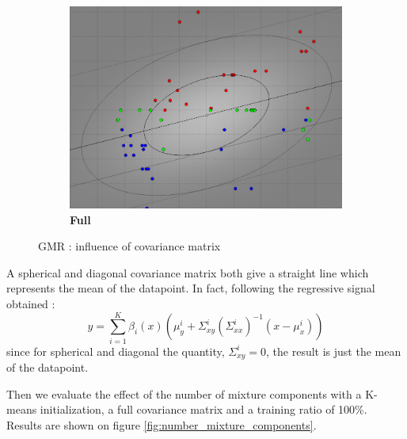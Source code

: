 \begin{figure}[!ht]
\begin{subfigure}[h]{0.3\textwidth}
\includegraphics[height=0.08\textheight]{./regression/full_cov_kmeans_1_mixture_100train.png}
\caption{\bf Full}
\end{subfigure}
\caption{GMR : influence of covariance matrix}
\label{fig:covariance_matrix_gmr}
\end{figure}



A spherical and diagonal covariance matrix both give a straight line which represents the mean of the datapoint. In fact, following the regressive signal obtained :
\begin{equation}
y = \sum_{i=1}^K \beta_i(x)(\mu_y^i + \Sigma_{xy}^i (\Sigma_{xx}^i)^{-1}(x - \mu_x^i))  
\label{GMR_output}
\end{equation}
since for spherical and diagonal the quantity, $\Sigma_{xy}^i = 0$, the result is just the mean of the datapoint. 

Then we evaluate the effect of the number of mixture components with a K-means initialization, a full covariance matrix and a training ratio of 100\%. Results are shown on figure \ref{fig:number_mixture_components}.

